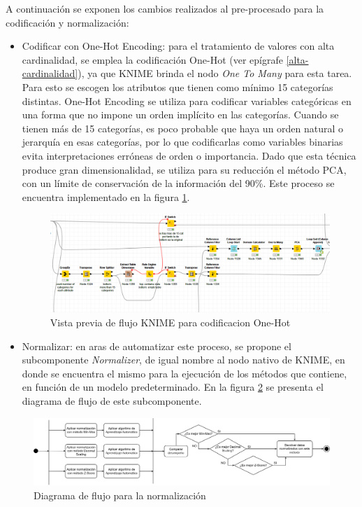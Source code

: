 A continuación se exponen los cambios realizados al pre-procesado para la codificación y normalización:

\begin{itemize}

	\item Codificar con One-Hot Encoding: para el tratamiento de valores con alta cardinalidad, se emplea la codificación One-Hot (ver epígrafe \ref{alta-cardinalidad}), ya que KNIME brinda el nodo \textit{One To Many} para esta tarea. Para esto se escogen los atributos que tienen como mínimo 15 categorías distintas. One-Hot Encoding se utiliza para codificar variables categóricas en una forma que no impone un orden implícito en las categorías. Cuando se tienen más de 15 categorías, es poco probable que haya un orden natural o jerarquía en esas categorías, por lo que codificarlas como variables binarias evita interpretaciones erróneas de orden o importancia. Dado que esta técnica produce gran dimensionalidad, se utiliza para su reducción el método PCA, con un límite de conservación de la información del 90\%. Este proceso se encuentra implementado en la figura \ref{fig:one-hot-flujo}.
	
	\begin{figure}[H]
		\centering
		\includegraphics[width=0.9\linewidth]{"figuras/capi 2/preprocesado/one-hot-flujo"}
		\caption{Vista previa de flujo KNIME para codificacion One-Hot}
		\label{fig:one-hot-flujo}
	\end{figure}
	
	\item Normalizar: en aras de automatizar este proceso, se propone el subcomponente \textit{Normalizer}, de igual nombre al nodo nativo de KNIME, en donde se encuentra el mismo para la ejecución de los métodos que contiene, en función de un modelo predeterminado. En la figura \ref{fig:normalizacion} se presenta el diagrama de flujo de este subcomponente. 

\end{itemize}

\begin{figure}[H]
	\centering
	\includegraphics[width=1\linewidth]{"figuras/capi 2/preprocesado/normalizacion.drawio"}
	\caption{Diagrama de flujo para la normalización}
	\label{fig:normalizacion}
\end{figure}


